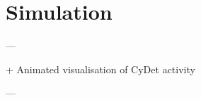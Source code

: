 \chapter{Simulation}\label{chapter3}

\begin{markdown}
---

+ Animated visualisation of CyDet activity

---
\end{markdown}